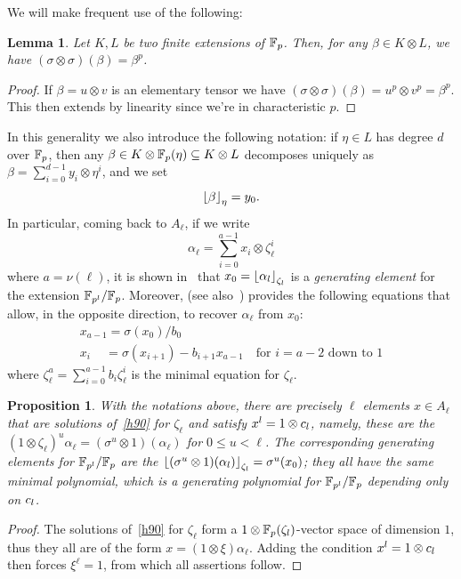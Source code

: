 \documentclass[sigconf]{acmart}
\newtheorem{proposition}[theorem]{Proposition}
\newtheorem{lemma}[theorem]{Lemma}
\begin{document}
We will make frequent use of the following:
\begin{lemma}
\label{FrobFrob}
Let $K,L$ be two finite extensions of $\mathbb{F}_{p}$.
Then, for any $\beta\in K\otimes L$,
we have $(\sigma\otimes\sigma)(\beta)=\beta^p$.
\end{lemma}
\begin{proof}
If $\beta=u\otimes v$ is an elementary tensor we have $(\sigma\otimes\sigma)(\beta)=u^p\otimes v^p=\beta^p$.
This then extends by linearity since we're in characteristic $p$. 
\end{proof}
In this generality we also introduce the following notation: if $\eta\in L$ has degree $d$ over $\mathbb{F}_{p}$,
then any $\beta\in K\otimes\mathbb{F}_{p}(\eta)\subseteq K\otimes L$ decomposes uniquely as $\beta = \sum_{i =  0}^{d-1}y_i\otimes\eta^i$,
and we set  \[ \left\lfloor \beta \right\rfloor_{\eta}=y_0. \]
In particular, coming back to $A_\ell$, if we write
\[ \alpha_\ell = \sum_{i=0}^{a-1}x_i\otimes\zeta_{\ell}^i \] where $a=\nu(\ell)$,
it is shown in~\cite{Allombert02} that $x_0=\left\lfloor \alpha_l \right\rfloor_{\zeta_l}$ is a \emph{generating element} for the extension
$\mathbb{F}_{p^l}/\mathbb{F}_{p}$.
Moreover, \cite{Allombert02} (see also~\cite{brieulle2018computing}) provides the following equations
that allow, in the opposite direction, to recover $\alpha_\ell$ from $x_0$:
\begin{equation}
\label{recoveralpha}
\begin{array}{l}
x_{a-1}=\sigma(x_0)/b_0\\
x_{i}\quad\,=\sigma(x_{i+1})-b_{i+1}x_{a-1}\quad\text{for $i=a\!-\!2$ down to $1$}
\end{array}
\end{equation}
where $\zeta_\ell^a=\sum_{i=0}^{a-1}b_i\zeta_\ell^i$ is the minimal equation for $\zeta_\ell$.

\begin{proposition}
\label{depend}
With the notations above, there are precisely $\ell$ elements $x\in A_\ell$ that are solutions of~\eqref{h90} for $\zeta_\ell$
and satisfy $x^l=1\otimes c_l$, namely, these are the $(1\otimes\zeta_\ell)^u\alpha_\ell=(\sigma^u\otimes 1)(\alpha_\ell)$
for $0\leq u<\ell$.
The corresponding generating elements for $\mathbb{F}_{p^l}/\mathbb{F}_{p}$ are the $\left\lfloor (\sigma^u\otimes 1)(\alpha_l) \right\rfloor_{\zeta_l}=\sigma^u(x_0)$;
they all have the same minimal polynomial, which is a generating polynomial for $\mathbb{F}_{p^l}/\mathbb{F}_{p}$ depending only on $c_l$.
\end{proposition}
\begin{proof}
The solutions of~\eqref{h90} for $\zeta_\ell$ form a $1\otimes\mathbb{F}_{p}(\zeta_{l})$-vector space of dimension $1$,
thus they all are of the form $x=(1\otimes\xi)\alpha_\ell$.
Adding the condition $x^l=1\otimes c_l$ then forces $\xi^\ell=1$,
from which all assertions follow.
\end{proof}
\end{document}
